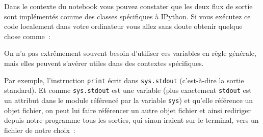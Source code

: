     Dans le contexte du notebook vous pouvez constater que les deux flux de
sortie sont implémentés comme des classes spécifiques à IPython. Si vous
exécutez ce code localement dans votre ordinateur vous allez sans doute
obtenir quelque chose comme~:

\begin{Shaded}
\begin{Highlighting}[frame=lines,framerule=0.6mm,rulecolor=\color{asisframecolor}]
\OperatorTok{<}\OperatorTok{=}\OperatorTok{=}\OperatorTok{=}\OperatorTok{>}
\OperatorTok{<}\OperatorTok{=}\OperatorTok{=}\OperatorTok{=}\OperatorTok{>}
\OperatorTok{<}\OperatorTok{=}\OperatorTok{=}\OperatorTok{=}\OperatorTok{>}
\end{Highlighting}
\end{Shaded}

    On n'a pas extrêmement souvent besoin d'utiliser ces variables en règle
générale, mais elles peuvent s'avérer utiles dans des contextes
spécifiques.

Par exemple, l'instruction \texttt{print} écrit dans \texttt{sys.stdout}
(c'est-à-dire la sortie standard). Et comme \texttt{sys.stdout} est une
variable (plus exactement \texttt{stdout} est un attribut dans le module
référencé par la variable \texttt{sys}) et qu'elle référence un objet
fichier, on peut lui faire référencer un autre objet fichier et ainsi
rediriger depuis notre programme tous les sorties, qui sinon iraient sur
le terminal, vers un fichier de notre choix~:

